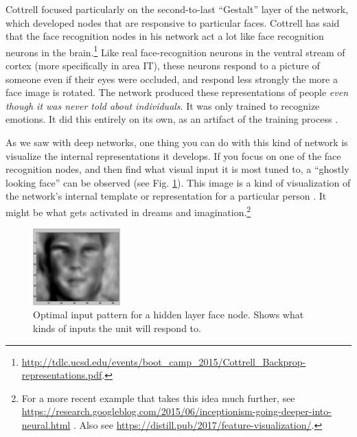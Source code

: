 Cottrell focused particularly on the second-to-last ``Gestalt'' layer of the network, which  developed nodes that are responsive to particular faces. Cottrell has said that the face recognition nodes in his network act a lot like face recognition neurons in the brain.\footnote{\url{http://tdlc.ucsd.edu/events/boot_camp_2015/Cottrell_Backprop-representations.pdf}.}  Like real face-recognition neurons in the ventral stream of cortex (more specifically in area IT), these neurons respond to a picture of someone even if their eyes were occluded, and respond less strongly the more a face image is rotated. The network produced these representations of people \emph{even though it was never told about individuals}. It was only trained to recognize emotions. It did this entirely on its own, as an artifact of the training process \cite{dailey2002empath}. 

As we saw with deep networks, one thing you can do with this kind of network is visualize the internal representations it develops. If you focus on one of the face recognition nodes, and then find what visual input it is most tuned to, a ``ghostly looking face'' can be observed (see Fig. \ref{holon}). This image is a kind of visualization of the network's internal template or representation for a particular person \cite{dailey2002empath}. It might be what gets activated in dreams and imagination.\footnote{For a more recent example that takes this idea much further, see \url{https://research.googleblog.com/2015/06/inceptionism-going-deeper-into-neural.html} \cite{mordvintsev2015inceptionism}. Also see \url{https://distill.pub/2017/feature-visualization/}.}

\begin{figure}[h]
\centering
\includegraphics[width=0.3\textwidth]{images/holon.png}
\caption[From \url{http://cseweb.ucsd.edu/\~gary/258a/Backprop.pdf}.]{Optimal input pattern for a hidden layer face node. Shows what kinds of inputs the unit will respond to.}
\label{holon}
\end{figure}

